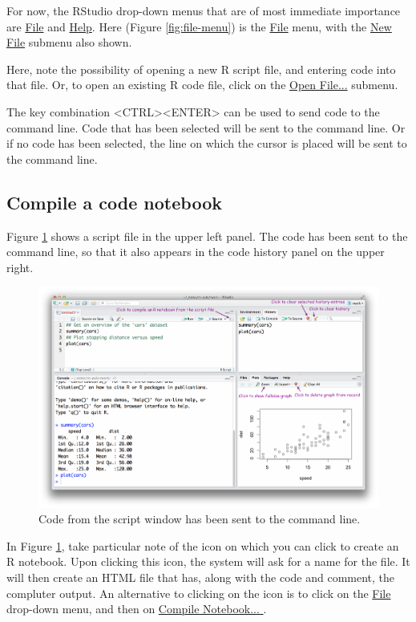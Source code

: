 For now, the RStudio drop-down menus that are of most immediate
importance are \underline{File} and \underline{Help}.  Here (Figure
\ref{fig:file-menu}) is the \underline{File} menu, with the
\underline{New File} submenu also shown.

Here, note the possibility of opening a new R script file, and
entering code into that file. Or, to open an existing R code file,
click on the \underline{Open File...} submenu.

The key combination <CTRL><ENTER> can be used to send code
to the command line.  Code that has been selected will be sent to the
command line.  Or if no code has been selected, the line on which the
cursor is placed will be sent to the command line.

\subsection{Compile a code notebook}

Figure \ref{fig:code-history} shows a script file in the upper left
panel.  The code has been sent to the command line, so that it also
appears in the code history panel on the upper right.

\begin{figure}
\includegraphics{figs-inc/03i-3panels.png}
\vspace*{-15pt}

\caption{Code from the script window has been sent to the command
  line.}\label{fig:code-history}
\end{figure}

In Figure \ref{fig:code-history}, take particular note of the icon on
which you can click to create an R notebook. Upon clicking this icon,
the system will ask for a name for the file.  It will then create an
HTML file that has, along with the code and comment, the compluter
output.
  An alternative to clicking on the icon is to
click on the \underline{File} drop-down menu, and then on
\underline{Compile Notebook... }.

